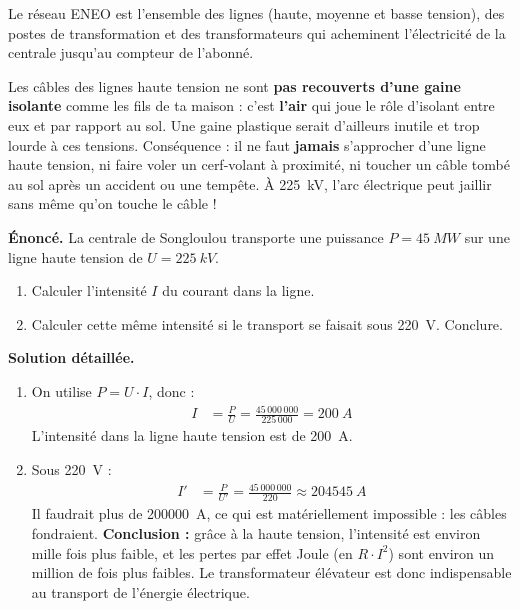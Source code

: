 \documentclass[11pt]{article}
\newcommand{\cle}[1]{{\popxbold\color{popdark}#1}}
\begin{document}
\begin{definition}
Le \cle{réseau ENEO} est l'ensemble des lignes (haute, moyenne et basse tension), des postes de transformation et des transformateurs qui acheminent l'électricité de la centrale jusqu'au compteur de l'abonné.
\end{definition}

\begin{savaistu}
Les câbles des lignes haute tension ne sont \textbf{pas recouverts d'une gaine isolante} comme les fils de ta maison : c'est \textbf{l'air} qui joue le rôle d'isolant entre eux et par rapport au sol. Une gaine plastique serait d'ailleurs inutile et trop lourde à ces tensions. Conséquence : il ne faut \textbf{jamais} s'approcher d'une ligne haute tension, ni faire voler un cerf-volant à proximité, ni toucher un câble tombé au sol après un accident ou une tempête. À \SI{225}{kV}, l'arc électrique peut jaillir sans même qu'on touche le câble !
\end{savaistu}

\begin{exoresolu}
\textbf{Énoncé.} La centrale de Songloulou transporte une puissance $P = \SI{45}{MW}$ sur une ligne haute tension de $U = \SI{225}{kV}$.
\begin{enumerate}
\item Calculer l'intensité $I$ du courant dans la ligne.
\item Calculer cette même intensité si le transport se faisait sous \SI{220}{V}. Conclure.
\end{enumerate}
\tcblower
\textbf{Solution détaillée.}
\begin{enumerate}
\item On utilise $P = U \cdot I$, donc :
\begin{align*}
I &= \frac{P}{U} = \frac{45\,000\,000}{225\,000} = \SI{200}{A}
\end{align*}
L'intensité dans la ligne haute tension est de \SI{200}{A}.
\item Sous \SI{220}{V} :
\begin{align*}
I' &= \frac{P}{U'} = \frac{45\,000\,000}{220} \approx \SI{204545}{A}
\end{align*}
Il faudrait plus de \SI{200000}{A}, ce qui est matériellement impossible : les câbles fondraient.
\textbf{Conclusion :} grâce à la haute tension, l'intensité est environ mille fois plus faible, et les pertes par effet Joule (en $R \cdot I^{2}$) sont environ un million de fois plus faibles. Le transformateur élévateur est donc indispensable au transport de l'énergie électrique.
\end{enumerate}
\end{exoresolu}
\end{document}
